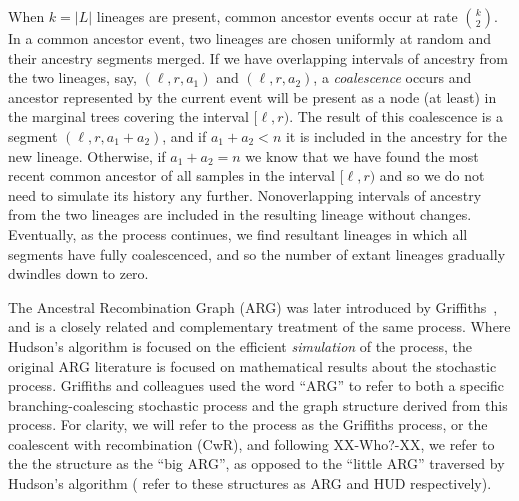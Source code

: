 \documentclass{article}
\begin{document}
When $k = |L|$ lineages are present, common ancestor events
occur at rate $\binom{k}{2}$. In a common ancestor event, two lineages
are chosen uniformly at random and their ancestry segments merged.
If we have overlapping intervals of ancestry from the two lineages,
say, $(\ell, r, a_1)$ and $(\ell, r, a_2)$, a
\emph{coalescence} occurs and ancestor represented by the current event
will be present as a node (at least) in the marginal trees covering
the interval $[\ell, r)$. The result of this coalescence is a segment
$(\ell, r, a_1 + a_2)$, and if $a_1 + a_2 < n$ it is included in the
ancestry for the new lineage. Otherwise, if $a_1 + a_2 = n$ we know that
we have found the most recent common ancestor of all samples in
the interval $[\ell, r)$ and so we do not need to simulate its history any further.
Nonoverlapping intervals of ancestry from the two lineages are included
in the resulting lineage without changes. Eventually, as the process continues,
we find resultant lineages in which all segments have fully coalescenced,
and so the number of extant lineages gradually dwindles down to zero.

The Ancestral Recombination Graph (ARG) was later introduced by
Griffiths~\citep{griffiths1991two,ethier1990two,griffiths1996ancestral,
griffiths1997ancestral}, and is a
closely related and complementary treatment of the same process. Where
Hudson's algorithm is focused on the efficient \emph{simulation} of the
process, the original ARG literature is focused on mathematical
results about the stochastic process. Griffiths and colleagues used the word
``ARG'' to refer to both a specific branching-coalescing stochastic process and
the graph structure derived from this process. For clarity, we will refer to the
process as the Griffiths process, or the coalescent with recombination (CwR),
and following XX-Who?-XX, we refer to the the structure as the ``big ARG'', as
opposed to the ``little ARG'' traversed by Hudson's algorithm
(\citet{wiuf1999recombination} refer to these structures as ARG and HUD respectively).
\end{document}
